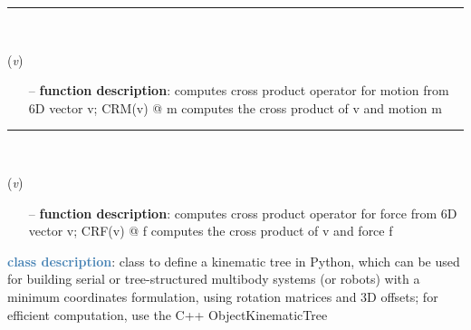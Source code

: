 \begin{itemize}[leftmargin=1.4cm]
\begin{itemize}[leftmargin=1.4cm]
\begin{itemize}[leftmargin=0.5cm]
\begin{itemize}[leftmargin=1.4cm]
\begin{itemize}[leftmargin=1.4cm]
\begin{itemize}[leftmargin=0.5cm]
\begin{itemize}[leftmargin=1.4cm]
\begin{itemize}[leftmargin=0.5cm]
\begin{itemize}[leftmargin=1.4cm]
\begin{itemize}[leftmargin=1.4cm]
\begin{itemize}[leftmargin=1.4cm]
%
\noindent\rule{8cm}{0.75pt}\vspace{1pt} \\ 
\begin{flushleft}
\label{sec:kinematicTree:CRM}
({\it v})
\end{flushleft}
\setlength{\itemindent}{0.7cm}
\begin{itemize}[leftmargin=0.7cm]
  \item[--]  {\bf function description}: computes cross product operator for motion from 6D vector v; CRM(v) @ m computes the cross product of v and motion m\vspace{12pt}\end{itemize}
%
\noindent\rule{8cm}{0.75pt}\vspace{1pt} \\ 
\begin{flushleft}
\label{sec:kinematicTree:CRF}
({\it v})
\end{flushleft}
\setlength{\itemindent}{0.7cm}
\begin{itemize}[leftmargin=0.7cm]
  \item[--]  {\bf function description}: computes cross product operator for force from 6D vector v; CRF(v) @ f computes the cross product of v and force f\vspace{12pt}\end{itemize}
%
\noindent\textcolor{steelblue}{{\bf class description}}:  class to define a kinematic tree in Python, which can be used for building serial or tree-structured multibody systems
         (or robots) with a minimum coordinates formulation, using rotation matrices and 3D offsets; for efficient computation, use the C++ ObjectKinematicTree
\setlength{\itemindent}{0.7cm}
\begin{itemize}[leftmargin=0.7cm]

\end{itemize}
\end{itemize}
\end{itemize}
\end{itemize}
\end{itemize}
\end{itemize}
\end{itemize}
\end{itemize}
\end{itemize}
\end{itemize}
\end{itemize}
\end{itemize}
